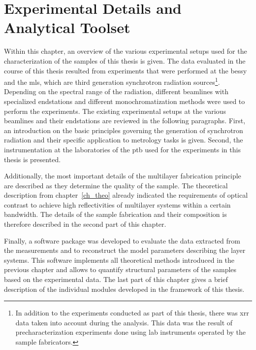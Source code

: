 \chapter{Experimental Details and Analytical Toolset} \label{ch_exp}
Within this chapter, an overview of the various experimental setups used for the characterization of the samples of this thesis is given. The data evaluated in the course of this thesis resulted from experiments that were performed at the \gls{bessy} and the \gls{mls}, which are third generation synchrotron radiation sources\footnote{In addition to the experiments conducted as part of this thesis, there was \gls{xrr} data taken into account during the analysis. This data was the result of precharacterization experiments done using lab instruments operated by the sample fabricators.}. Depending on the spectral range of the radiation, different beamlines with specialized endstations and different monochromatization methods were used to perform the experiments. The existing experimental setups at the various beamlines and their endstations are reviewed in the following paragraphs. First, an introduction on the basic principles governing the generation of synchrotron radiation and their specific application to metrology tasks is given. Second, the instrumentation at the laboratories of the \gls{ptb} used for the experiments in this thesis is presented.

Additionally, the most important details of the multilayer fabrication principle are described as they determine the quality of the sample. The theoretical description from chapter~\ref{ch_theo} already indicated the requirements of optical contrast to achieve high reflectivities of multilayer systems within a certain bandwidth. The details of the sample fabrication and their composition is therefore described in the second part of this chapter.

Finally, a software package was developed to evaluate the data extracted from the measurements and to reconstruct the model parameters describing the layer systems. This software implements all theoretical methods introduced in the previous chapter and allows to quantify structural parameters of the samples based on the experimental data. The last part of this chapter gives a brief description of the individual modules developed in the framework of this thesis.

